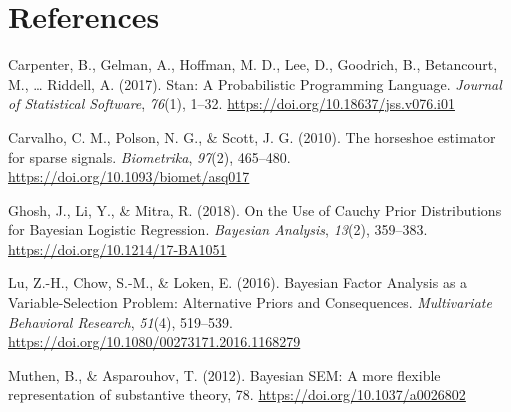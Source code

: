 \documentclass[
  english,
  man]{apa6}
\newlength{\cslhangindent}
\newlength{\cslentryspacingunit} %
\newenvironment{CSLReferences}[2] %
 {%
  \setlength{\parindent}{0pt}
  \ifodd #1
  \let\oldpar\par
  \def\par{\hangindent=\cslhangindent\oldpar}
  \fi
  \setlength{\parskip}{#2\cslentryspacingunit}
 }%
 {}
\begin{document}
\clearpage

\hypertarget{references}{%
\section{References}\label{references}}

\begingroup
\setlength{\parindent}{-0.5in}
\setlength{\leftskip}{0.5in}

\hypertarget{refs}{}
\begin{CSLReferences}{1}{0}
\leavevmode{}%
Carpenter, B., Gelman, A., Hoffman, M. D., Lee, D., Goodrich, B., Betancourt, M., \ldots{} Riddell, A. (2017). Stan: {A} {Probabilistic} {Programming} {Language}. \emph{Journal of Statistical Software}, \emph{76}(1), 1--32. \url{https://doi.org/10.18637/jss.v076.i01}

\leavevmode{}%
Carvalho, C. M., Polson, N. G., \& Scott, J. G. (2010). The horseshoe estimator for sparse signals. \emph{Biometrika}, \emph{97}(2), 465--480. \url{https://doi.org/10.1093/biomet/asq017}

\leavevmode{}%
Ghosh, J., Li, Y., \& Mitra, R. (2018). On the {Use} of {Cauchy} {Prior} {Distributions} for {Bayesian} {Logistic} {Regression}. \emph{Bayesian Analysis}, \emph{13}(2), 359--383. \url{https://doi.org/10.1214/17-BA1051}

\leavevmode{}%
Lu, Z.-H., Chow, S.-M., \& Loken, E. (2016). Bayesian {Factor} {Analysis} as a {Variable}-{Selection} {Problem}: {Alternative} {Priors} and {Consequences}. \emph{Multivariate Behavioral Research}, \emph{51}(4), 519--539. \url{https://doi.org/10.1080/00273171.2016.1168279}

\leavevmode{}%
Muthen, B., \& Asparouhov, T. (2012). Bayesian {SEM}: {A} more ﬂexible representation of substantive theory, 78. \url{https://doi.org/10.1037/a0026802}

\end{CSLReferences}

\endgroup
\end{document}

